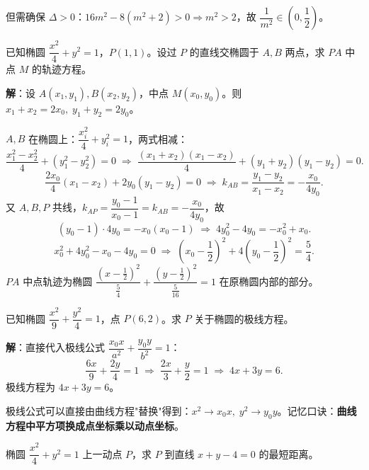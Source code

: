 \documentclass[12pt, a4paper]{ctexart}
\begin{document}
但需确保 $\Delta>0$：$16m^2-8(m^2+2)>0\Rightarrow m^2>2$，故 $\dfrac{1}{m^2}\in\left(0,\dfrac{1}{2}\right)$。

\vspace{6pt}

\begin{examplebox}
已知椭圆 $\dfrac{x^2}{4}+y^2=1$，$P(1,1)$。设过 $P$ 的直线交椭圆于 $A,B$ 两点，求 $PA$ 中点 $M$ 的轨迹方程。
\end{examplebox}

\noindent\textbf{解}：设 $A(x_1,y_1),B(x_2,y_2)$，中点 $M(x_0,y_0)$。则 $x_1+x_2=2x_0,\;y_1+y_2=2y_0$。

$A,B$ 在椭圆上：$\dfrac{x_i^2}{4}+y_i^2=1$，两式相减：
\[
  \frac{x_1^2-x_2^2}{4}+(y_1^2-y_2^2)=0\;\Longrightarrow\;\frac{(x_1+x_2)(x_1-x_2)}{4}+(y_1+y_2)(y_1-y_2)=0.
\]
\[
  \frac{2x_0}{4}(x_1-x_2)+2y_0(y_1-y_2)=0\;\Longrightarrow\;k_{AB}=\frac{y_1-y_2}{x_1-x_2}=-\frac{x_0}{4y_0}.
\]
又 $A,B,P$ 共线，$k_{AP}=\dfrac{y_0-1}{x_0-1}=k_{AB}=-\dfrac{x_0}{4y_0}$，故
\[
  (y_0-1)\cdot4y_0=-x_0(x_0-1)\;\Longrightarrow\;4y_0^2-4y_0=-x_0^2+x_0.
\]
\[
  x_0^2+4y_0^2-x_0-4y_0=0\;\Longrightarrow\;\left(x_0-\frac{1}{2}\right)^2+4\!\left(y_0-\frac{1}{2}\right)^2=\frac{5}{4}.
\]
$PA$ 中点轨迹为椭圆 $\dfrac{\left(x-\frac{1}{2}\right)^2}{\frac{5}{4}}+\dfrac{\left(y-\frac{1}{2}\right)^2}{\frac{5}{16}}=1$ 在原椭圆内部的部分。

\vspace{6pt}

\begin{examplebox}[【例题6】极线方程的直接应用]
已知椭圆 $\dfrac{x^2}{9}+\dfrac{y^2}{4}=1$，点 $P(6,2)$。求 $P$ 关于椭圆的极线方程。
\end{examplebox}

\noindent\textbf{解}：直接代入极线公式 $\dfrac{x_0 x}{a^2}+\dfrac{y_0 y}{b^2}=1$：
\[
  \frac{6x}{9}+\frac{2y}{4}=1\;\Longrightarrow\;\frac{2x}{3}+\frac{y}{2}=1\;\Longrightarrow\;4x+3y=6.
\]
极线方程为 $4x+3y=6$。

\begin{tipbox}[规律总结]
极线公式可以直接由曲线方程"替换"得到：$x^2\to x_0 x,\;y^2\to y_0 y$。记忆口诀：\textbf{曲线方程中平方项换成点坐标乘以动点坐标}。
\end{tipbox}

\vspace{6pt}

\begin{examplebox}[【例题7】参数方程简化计算]
椭圆 $\dfrac{x^2}{4}+y^2=1$ 上一动点 $P$，求 $P$ 到直线 $x+y-4=0$ 的最短距离。
\end{examplebox}
\end{document}
